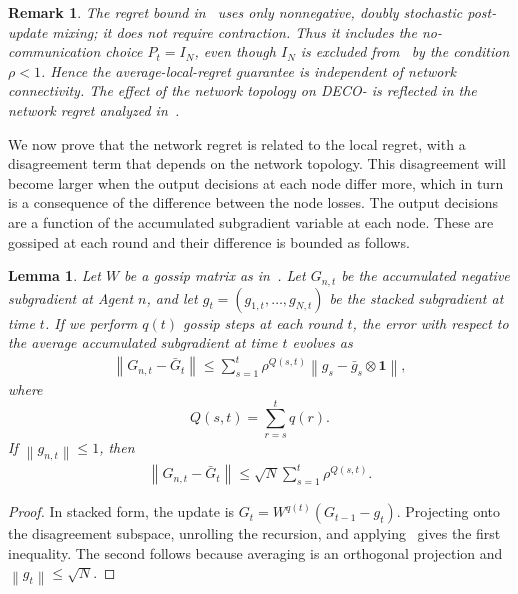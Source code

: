 \documentclass[journal]{IEEEtran}
\newtheorem{lemma}{Lemma}
\newtheorem{remark}{Remark}
\newcommand{\norm}[1]{\left\lVert{#1}\right\rVert}
\newcommand{\algname}{{DECO}\xspace}
\begin{document}
{\color{blue}
    \begin{remark}
        The regret bound in~ uses only nonnegative, doubly stochastic post-update mixing; it does not require contraction.
        Thus it includes the no-communication choice $P_t=I_N$, even though $I_N$ is excluded from~ by the condition $\rho<1$.
        Hence the average-local-regret guarantee is independent of network connectivity.
        The effect of the network topology on \algname{}- is reflected in the network regret analyzed in~.
    \end{remark}
}

We now prove that the network regret is related to the local regret, with a disagreement term that depends on the network topology.
This disagreement will become larger when the output decisions at each node differ more, which in turn is a consequence of the difference between the node losses.
The output decisions are a function of the accumulated subgradient variable at each node.
These are gossiped at each round and their difference is bounded as follows.
    {\color{blue}
        \begin{lemma}\label{lemma:G-gossip}
            Let $W$ be a gossip matrix as in~.
            Let $G_{n,t}$ be the accumulated negative subgradient at Agent $n$, and let $g_t = (g_{1,t}, \ldots, g_{N,t})$ be the stacked subgradient at time $t$.
            If we perform $q(t)$ gossip steps at each round $t$, the error with respect to the average accumulated subgradient at time $t$ evolves as
            \begin{align}
                \norm{G_{n,t} - \bar G_t} \leq \sum_{s=1}^t \rho^{Q(s,t)} \norm{g_{s} - \bar g_s \otimes \mathbf{1}},
            \end{align}
            where
            \begin{equation}
                Q(s,t) = \sum_{r=s}^t q(r).
            \end{equation}
            If $\norm{g_{n,t}}\leq1$, then
            \begin{align}
                \norm{G_{n,t} - \bar G_t} \leq \sqrt{N} \sum_{s=1}^t \rho^{Q(s,t)}.
            \end{align}
        \end{lemma}
        \begin{proof}
            In stacked form, the update is $G_t=W^{q(t)}(G_{t-1}-g_t)$.
            Projecting onto the disagreement subspace, unrolling the recursion, and applying~ gives the first inequality.
            The second follows because averaging is an orthogonal projection and $\norm{g_t}\leq\sqrt{N}$.
        \end{proof}
    }
\end{document}
